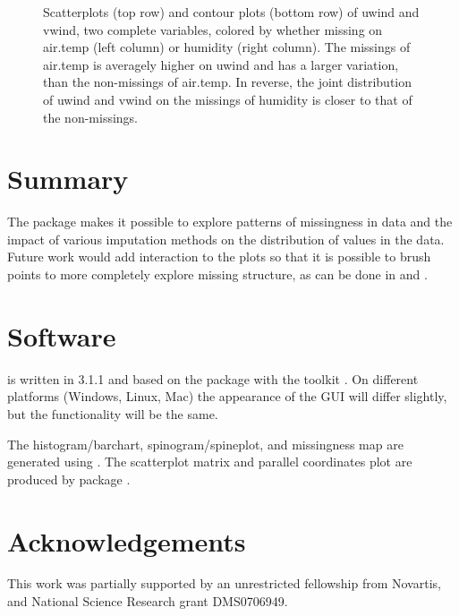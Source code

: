 \documentclass[article]{jss}
\begin{document}
\begin{center}
\begin{figure}[h]
\begin{centering}
\begin{tabular}{ccc}
\end{tabular}
\par\end{centering}
\caption{Scatterplots (top row) and contour plots (bottom row) of
uwind and vwind, two complete variables, colored by whether missing
on air.temp (left column) or humidity (right column). The missings
of air.temp is averagely higher on uwind and has a larger variation,
than the non-missings of air.temp. In reverse, the joint distribution
of uwind and vwind on the missings of humidity is closer to that of
the non-missings.}
\label{fig:uvwind}
\end{figure}
\par\end{center}


\section{Summary}

The   package makes it possible to explore
patterns of missingness in data and the impact of various
imputation methods on the distribution of values in the data.
Future work would add interaction to the plots so that it is
possible to brush points to more completely explore missing
structure, as can be done in  and .


\section*{Software}

 is written in  3.1.1 \citep{r} and
based on the package  \citep{gwidgets} with the
toolkit . On different platforms (Windows, Linux,
Mac) the appearance of the GUI will differ slightly, but the
functionality will be the same.

The histogram/barchart, spinogram/spineplot, and missingness map
are generated using  \citep{ggplot2}. The scatterplot
matrix and parallel coordinates plot are produced by package
 \citep{ggally}.

\section*{Acknowledgements}

This work was partially supported by an unrestricted fellowship
from Novartis, and National Science Research grant DMS0706949.


\end{document}
